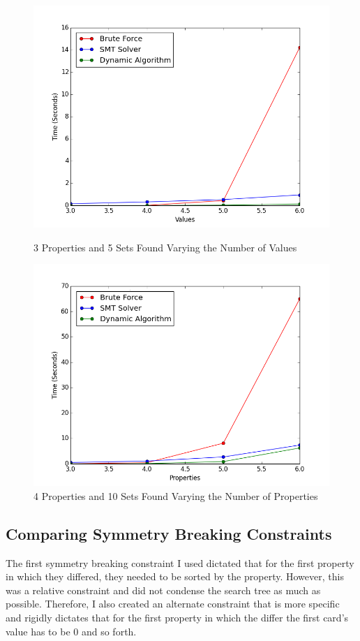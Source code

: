 \documentclass[pageno]{jpaper}
\begin{document}
\begin{figure}[htbb]
\begin{minipage}[b]{0.5\linewidth}
\centering
\includegraphics[width=.75\linewidth]{BADBRUTEVAL-v3456p3n5.png}
\caption{3 Properties and 5 Sets Found Varying the Number of Values}
\label{fig:bruteVal}
\end{minipage}
\hspace{0.5cm}
\begin{minipage}[b]{0.5\linewidth}
\centering
\includegraphics[width=.75\linewidth]{BADBRUTEPROP-v4p3456n10.png}
\caption{4 Properties and 10 Sets Found Varying the Number of Properties}
\label{fig:bruteProp}
\end{minipage}
\end{figure}



\subsection{Comparing Symmetry Breaking Constraints}

The first symmetry breaking constraint I used dictated that for the first property in which they differed, they needed to be sorted by the property. However, this was a relative constraint and did not condense the search tree as much as possible. Therefore, I also created an alternate constraint that is more specific and rigidly dictates that for the first property in which the differ the first card's value has to be 0 and so forth. 
\end{document}
